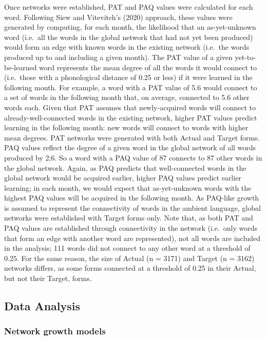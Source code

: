 \documentclass[
  man]{apa6}
\begin{document}
Once networks were established, PAT and PAQ values were calculated for each word. Following Siew and Vitevitch's (2020) approach, these values were generated by computing, for each month, the likelihood that an as-yet-unknown word (i.e.~all the words in the global network that had not yet been produced) would form an edge with known words in the existing network (i.e.~the words produced up to and including a given month). The PAT value of a given yet-to-be-learned word represents the mean degree of all the words it would connect to (i.e.~those with a phonological distance of 0.25 or less) if it were learned in the following month. For example, a word with a PAT value of 5.6 would connect to a set of words in the following month that, on average, connected to 5.6 other words each. Given that PAT assumes that newly-acquired words will connect to already-well-connected words in the existing network, higher PAT values predict learning in the following month: new words will connect to words with higher mean degrees. PAT networks were generated with both Actual and Target forms. PAQ values reflect the degree of a given word in the global network of all words produced by 2;6. So a word with a PAQ value of 87 connects to 87 other words in the global network. Again, as PAQ predicts that well-connected words in the global network would be acquired earlier, higher PAQ values predict earlier learning; in each month, we would expect that as-yet-unknown words with the highest PAQ values will be acquired in the following month. As PAQ-like growth is assumed to represent the connectivity of words in the ambient language, global networks were established with Target forms only. Note that, as both PAT and PAQ values are established through connectivity in the network (i.e.~only words that form an edge with another word are represented), not all words are included in the analysis; 111 words did not connect to any other word at a threshold of 0.25. For the same reason, the size of Actual (n = 3171) and Target (n = 3162) networks differs, as some forms connected at a threshold of 0.25 in their Actual, but not their Target, forms.

\hypertarget{data-analysis}{%
\subsection{Data Analysis}\label{data-analysis}}

\hypertarget{network-growth-models}{%
\subsubsection{Network growth models}\label{network-growth-models}}
\end{document}
